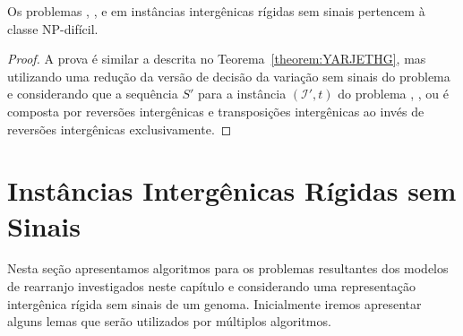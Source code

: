 \begin{theorem}\label{theorem:RDOZOOIB}
Os problemas \SbIRT, \SbIRTI, \SbIRTM{} e \SbIRTMI{} em instâncias intergênicas rígidas sem sinais pertencem à classe NP-difícil.
\end{theorem}
\begin{proof}
A prova é similar a descrita no Teorema~\ref{theorem:YARJETHG}, mas utilizando uma redução da versão de decisão da variação sem sinais do problema \SbRT{} e considerando que a sequência $S'$ para a instância $(\mathcal{I'},t)$ do problema \SbIRT{}, \SbIRTI{}, \SbIRTM{} ou \SbIRTMI{} é composta por reversões intergênicas e transposições intergênicas ao invés de reversões intergênicas exclusivamente.
\end{proof}

\section{Instâncias Intergênicas Rígidas sem Sinais}

Nesta seção apresentamos algoritmos para os problemas resultantes dos modelos de rearranjo investigados neste capítulo e considerando uma representação intergênica rígida sem sinais de um genoma. Inicialmente iremos apresentar alguns lemas que serão utilizados por múltiplos algoritmos. 

